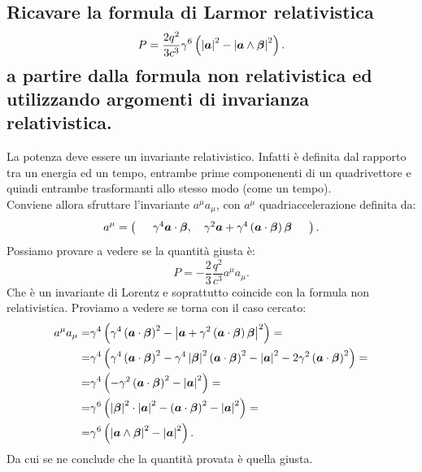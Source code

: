 \subsection[]{Ricavare la formula di Larmor relativistica 
\[
	P=\frac{2q^2}{3c^3}\gamma^{6}\left( \left| \boldsymbol{a} \right| ^2 - \left| \boldsymbol{a}\wedge \boldsymbol{\beta}  \right| ^2 \right) 
.\] a partire dalla formula non relativistica ed utilizzando argomenti di invarianza relativistica.}
\label{sec:3.b.15}
La potenza deve essere un invariante relativistico. Infatti è definita dal rapporto tra un energia ed un tempo, entrambe prime componenenti di un quadrivettore e quindi entrambe trasformanti allo stesso modo (come un tempo).\\
Conviene allora sfruttare l'invariante $a^{\mu}a_{\mu}$, con $a^{\mu}$ quadriaccelerazione definita da:
\[
	a^{\mu}=
	\left( \quad
	\begin{array}{c}
		\gamma^{4}\boldsymbol{a}\cdot \boldsymbol{\beta}, \quad 
		\gamma^2 \boldsymbol{a}+\gamma^{4} \left( \boldsymbol{a}\cdot \boldsymbol{\beta} \right) \boldsymbol{\beta}
	\end{array}
	\quad \right)
.\] 
Possiamo provare a vedere se la quantità giusta è: \[
	P=-\frac{2}{3} \frac{q^2}{c^3}a^{\mu}a_{\mu}
.\] 
Che è un invariante di Lorentz e soprattutto coincide con la formula non relativistica. Proviamo a vedere se torna con il caso cercato:
\begin{align*}
	a^{\mu}a_{\mu}=&\gamma^{4}\left( \gamma^{4}\left( \boldsymbol{a}\cdot \boldsymbol{\beta} \right) ^2 - \left| \boldsymbol{a}+ \gamma^2\left( \boldsymbol{a}\cdot \boldsymbol{\beta} \right) \boldsymbol{\beta} \right| ^2 \right)=\\
	=& \gamma^{4}\left( \gamma^{4}\left( \boldsymbol{a}\cdot \boldsymbol{\beta} \right)^2-\gamma^{4}\left| \boldsymbol{\beta} \right|^2 \left( \boldsymbol{a}\cdot \boldsymbol{\beta} \right)^2 - \left| \boldsymbol{a} \right| ^2 - 2\gamma^2\left( \boldsymbol{a}\cdot \boldsymbol{\beta} \right) ^2   \right) =\\
	=& \gamma^{4}\left( -\gamma^2\left( \boldsymbol{a}\cdot \boldsymbol{\beta} \right)^2-\left| \boldsymbol{a} \right|^2 \right)=\\
	=& \gamma^{6}\left( \left| \boldsymbol{\beta} \right|^2\cdot  \left| \boldsymbol{a} \right|^2 - \left( \boldsymbol{a}\cdot \boldsymbol{\beta} \right)^2 - \left| \boldsymbol{a} \right|^2\right)=\\
	=& \gamma^{6}\left( \left| \boldsymbol{a}\wedge \boldsymbol{\beta}  \right|^2-\left| \boldsymbol{a} \right|^2 \right) 
.\end{align*}
Da cui se ne conclude che la quantità provata è quella giusta.

